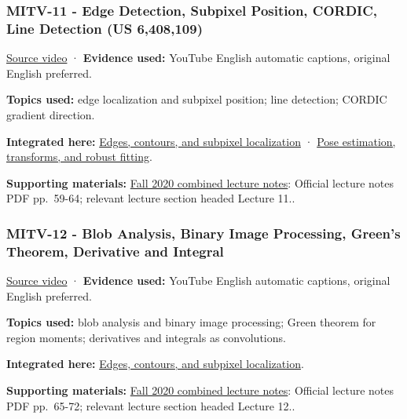\subsubsection{MITV-11 - Edge Detection, Subpixel Position, CORDIC, Line Detection (US 6,408,109)}\label{04-visual-computing-ii-ch036-mitv-11---edge-detection-subpixel-position-cordic-line-detection-us-6408109}

\href{https://www.youtube.com/watch?v=kjCQ2DUn55Y}{Source video} · \textbf{Evidence used:} YouTube English automatic captions, original English preferred.

\textbf{Topics used:} edge localization and subpixel position; line detection; CORDIC gradient direction.

\textbf{Integrated here:} \hyperref[04-visual-computing-ii-ch030-edges-contours-and-subpixel-localization]{Edges, contours, and subpixel localization} · \hyperref[04-visual-computing-ii-ch032-pose-estimation-transforms-and-robust-fitting]{Pose estimation, transforms, and robust fitting}.

\textbf{Supporting materials:} \href{https://ocw.mit.edu/courses/6-801-machine-vision-fall-2020/9ec44f69e72995c370b3797818ba01e6_MIT6_801F20_lectureNotes.pdf}{Fall 2020 combined lecture notes}: Official lecture notes PDF pp.~59-64; relevant lecture section headed Lecture 11..

\subsubsection{MITV-12 - Blob Analysis, Binary Image Processing, Green's Theorem, Derivative and Integral}\label{04-visual-computing-ii-ch036-mitv-12---blob-analysis-binary-image-processing-greens-theorem-derivative-and-integral}

\href{https://www.youtube.com/watch?v=jLvgNmGuxGk}{Source video} · \textbf{Evidence used:} YouTube English automatic captions, original English preferred.

\textbf{Topics used:} blob analysis and binary image processing; Green theorem for region moments; derivatives and integrals as convolutions.

\textbf{Integrated here:} \hyperref[04-visual-computing-ii-ch030-edges-contours-and-subpixel-localization]{Edges, contours, and subpixel localization}.

\textbf{Supporting materials:} \href{https://ocw.mit.edu/courses/6-801-machine-vision-fall-2020/9ec44f69e72995c370b3797818ba01e6_MIT6_801F20_lectureNotes.pdf}{Fall 2020 combined lecture notes}: Official lecture notes PDF pp.~65-72; relevant lecture section headed Lecture 12..

